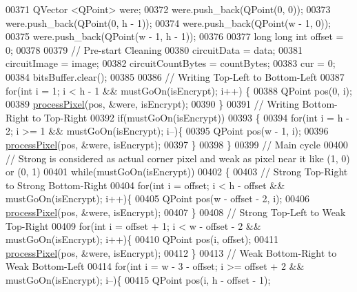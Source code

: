 \begin{DoxyCode}
00371     QVector <QPoint> were;
00372     were.push\_back(QPoint(0, 0));
00373     were.push\_back(QPoint(0, h - 1));
00374     were.push\_back(QPoint(w - 1, 0));
00375     were.push\_back(QPoint(w - 1, h - 1));
00376 
00377     \textcolor{keywordtype}{long} \textcolor{keywordtype}{long} \textcolor{keywordtype}{int} offset = 0;
00378 
00379     \textcolor{comment}{// Pre-start Cleaning}
00380     circuitData = data;
00381     circuitImage = image;
00382     circuitCountBytes = countBytes;
00383     cur = 0;
00384     bitsBuffer.clear();
00385 
00386     \textcolor{comment}{// Writing Top-Left to Bottom-Left}
00387     \textcolor{keywordflow}{for}(\textcolor{keywordtype}{int} i = 1; i < h - 1 && mustGoOn(isEncrypt); i++) \{
00388         QPoint pos(0, i);
00389         \hyperlink{class_model_p_c_a1171f9fe1550133dc9053a46b4e5bcfd}{processPixel}(pos, &were, isEncrypt);
00390     \}
00391     \textcolor{comment}{// Writing Bottom-Right to Top-Right}
00392     \textcolor{keywordflow}{if}(mustGoOn(isEncrypt))
00393     \{
00394         \textcolor{keywordflow}{for}(\textcolor{keywordtype}{int} i = h - 2; i >= 1 && mustGoOn(isEncrypt); i--)\{
00395             QPoint pos(w - 1, i);
00396             \hyperlink{class_model_p_c_a1171f9fe1550133dc9053a46b4e5bcfd}{processPixel}(pos, &were, isEncrypt);
00397         \}
00398     \}
00399     \textcolor{comment}{// Main cycle}
00400     \textcolor{comment}{// Strong is considered as actual corner pixel and weak as pixel near it like (1, 0) or (0, 1)}
00401     \textcolor{keywordflow}{while}(mustGoOn(isEncrypt))
00402     \{
00403         \textcolor{comment}{// Strong Top-Right to Strong Bottom-Right}
00404         \textcolor{keywordflow}{for}(\textcolor{keywordtype}{int} i = offset; i < h - offset && mustGoOn(isEncrypt); i++)\{
00405             QPoint pos(w - offset - 2, i);
00406             \hyperlink{class_model_p_c_a1171f9fe1550133dc9053a46b4e5bcfd}{processPixel}(pos, &were, isEncrypt);
00407         \}
00408         \textcolor{comment}{// Strong Top-Left to Weak Top-Right}
00409         \textcolor{keywordflow}{for}(\textcolor{keywordtype}{int} i = offset + 1; i < w - offset - 2 && mustGoOn(isEncrypt); i++)\{
00410             QPoint pos(i, offset);
00411             \hyperlink{class_model_p_c_a1171f9fe1550133dc9053a46b4e5bcfd}{processPixel}(pos, &were, isEncrypt);
00412         \}
00413         \textcolor{comment}{// Weak Bottom-Right to Weak Bottom-Left}
00414         \textcolor{keywordflow}{for}(\textcolor{keywordtype}{int} i = w - 3 - offset; i >= offset + 2 && mustGoOn(isEncrypt); i--)\{
00415             QPoint pos(i, h - offset - 1);

\end{DoxyCode}
